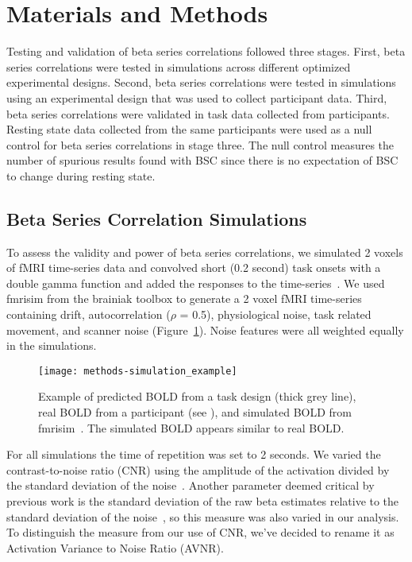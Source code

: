 \documentclass[phd,appendix,figures]{uithesis}
\begin{document}
\section{Materials and Methods}
\label{methods}

Testing and validation of beta series correlations followed three stages.
First, beta series correlations were tested in simulations across different
optimized experimental designs.
Second, beta series correlations were tested in simulations using an experimental
design that was used to collect participant data.
Third, beta series correlations were validated in task data collected from
participants.
Resting state data collected from the same participants were used as a null
control for beta series correlations in stage three.
The null control measures the number of spurious results found
with BSC since there is no expectation of BSC to change
during resting state.

\subsection*{Beta Series Correlation Simulations}
\label{methods:bsc-simulations}

To assess the validity and power of beta series correlations,
we simulated 2 voxels of fMRI time-series data and convolved short (0.2 second)
task onsets with a double gamma function
and added the responses to the time-series~\cite{Glover1999,Welvaert2011}.
We used fmrisim from the brainiak toolbox\cite{Ellis2020} to generate a
2 voxel fMRI time-series containing drift, autocorrelation ($\rho$ = 0.5), physiological noise,
task related movement, and scanner noise (Figure~\ref{fig:simulation_example}).
Noise features were all weighted equally in the simulations.

\begin{figure}[H]
  \centering
  \texttt{[image: methods-simulation\_example]}
  \caption[Illustration of simulated data]{
    Example of predicted BOLD from a task design (thick grey line), real BOLD
    from a participant (see ), and simulated BOLD
    from fmrisim~\cite{Ellis2020}.
    The simulated BOLD appears similar to real BOLD.
  }
  \label{fig:simulation_example}
\end{figure}

For all simulations the time of repetition was set to 2 seconds.
We varied the contrast-to-noise ratio (CNR) using the amplitude of the activation
divided by the standard deviation of the noise~\cite{Welvaert2013a}.
Another parameter deemed critical by previous work is the standard deviation
of the raw beta estimates relative to the standard deviation of the noise~\cite{Abdulrahman2016},
so this measure was also varied in our analysis.
To distinguish the measure from our use of CNR,
we've decided to rename it as Activation Variance to Noise Ratio (AVNR).
\end{document}
